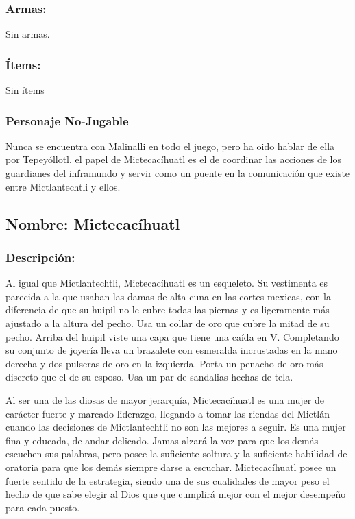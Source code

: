 \documentclass[11pt,letterpaper]{article}
\begin{document}
        \subsubsection{Armas:}
Sin armas.
        \subsubsection{Ítems:}
Sin ítems
        \subsubsection{Personaje No-Jugable}
Nunca se encuentra con Malinalli en todo el juego, pero ha oido hablar de ella por Tepeyóllotl, el papel de Mictecacíhuatl es el de coordinar las acciones de los guardianes del inframundo y servir como un puente en la comunicación que existe entre Mictlantechtli y ellos.


\subsection{Nombre: Mictecacíhuatl}  \label{per.mictecacihuatl}
\subsubsection{Descripción:}   
Al igual que Mictlantechtli,  Mictecacíhuatl es un esqueleto. Su vestimenta es parecida a la que usaban las damas de alta cuna en las cortes mexicas, con la diferencia de que su huipil no le cubre todas las piernas y es ligeramente más ajustado a la altura del pecho. Usa un collar de oro que cubre la mitad de su pecho. Arriba del huipil viste una capa que tiene una caída en V. Completando su conjunto de joyería lleva un brazalete con esmeralda incrustadas en la mano derecha y dos pulseras de oro en la izquierda. Porta un penacho de oro más discreto que el de su esposo. Usa un par de sandalias hechas de tela.
\\
\par
Al ser una de las diosas de mayor jerarquía,  Mictecacíhuatl es una mujer de  carácter fuerte y marcado liderazgo, llegando a tomar las riendas del Mictlán cuando las decisiones de  Mictlantechtli no son las mejores a seguir. Es una mujer fina y educada, de andar delicado. Jamas alzará la voz para que los demás escuchen sus palabras, pero posee la suficiente soltura y la suficiente habilidad de oratoria para que los demás siempre darse a escuchar. Mictecacíhuatl posee un fuerte sentido de la estrategia, siendo una de sus cualidades de mayor peso el hecho de que sabe elegir al Dios que que cumplirá mejor con el mejor desempeño para cada puesto. 
\end{document}
